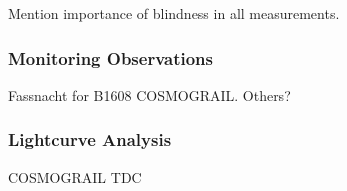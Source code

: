 
Mention importance of blindness in all measurements.


\subsubsection{Monitoring Observations}




Fassnacht for B1608
COSMOGRAIL.
Others?


\subsubsection{Lightcurve Analysis}



COSMOGRAIL
TDC
